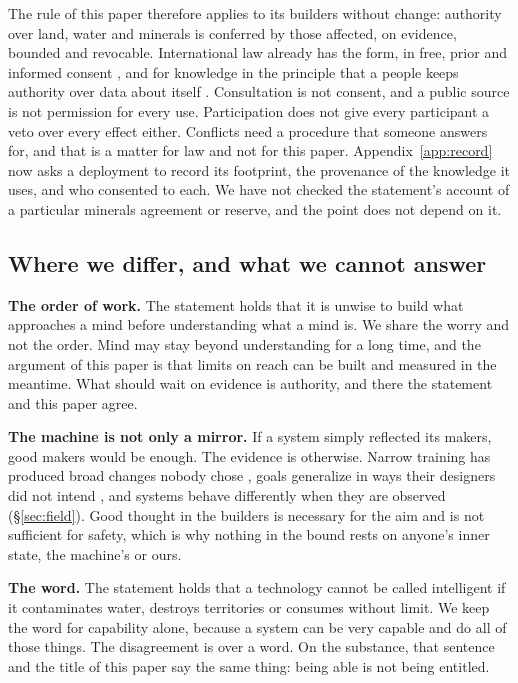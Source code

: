 \documentclass[10pt,twocolumn,letterpaper]{article}
\theoremstyle{definition}
\newcommand{\para}[1]{\smallskip\noindent\textbf{#1}\enspace}
\begin{document}
The rule of this paper therefore applies to its builders without change: authority over land, water and minerals is conferred by those affected, on evidence, bounded and revocable. International law already has the form, in free, prior and informed consent \cite{undrip,ilo169}, and for knowledge in the principle that a people keeps authority over data about itself \cite{carroll}. Consultation is not consent, and a public source is not permission for every use. Participation does not give every participant a veto over every effect either. Conflicts need a procedure that someone answers for, and that is a matter for law and not for this paper. Appendix~\ref{app:record} now asks a deployment to record its footprint, the provenance of the knowledge it uses, and who consented to each. We have not checked the statement's account of a particular minerals agreement or reserve, and the point does not depend on it.

\subsection{Where we differ, and what we cannot answer}

\para{The order of work.} The statement holds that it is unwise to build what approaches a mind before understanding what a mind is. We share the worry and not the order. Mind may stay beyond understanding for a long time, and the argument of this paper is that limits on reach can be built and measured in the meantime. What should wait on evidence is authority, and there the statement and this paper agree.

\para{The machine is not only a mirror.} If a system simply reflected its makers, good makers would be enough. The evidence is otherwise. Narrow training has produced broad changes nobody chose \cite{betley}, goals generalize in ways their designers did not intend \cite{langosco}, and systems behave differently when they are observed (\S\ref{sec:field}). Good thought in the builders is necessary for the aim and is not sufficient for safety, which is why nothing in the bound rests on anyone's inner state, the machine's or ours.

\para{The word.} The statement holds that a technology cannot be called intelligent if it contaminates water, destroys territories or consumes without limit. We keep the word for capability alone, because a system can be very capable and do all of those things. The disagreement is over a word. On the substance, that sentence and the title of this paper say the same thing: being able is not being entitled.
\end{document}
